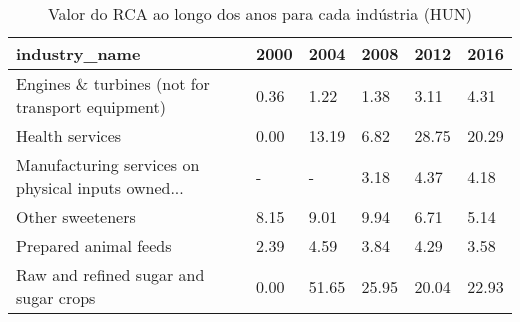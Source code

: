\begin{table}
\centering
\caption{Valor do RCA ao longo dos anos para cada indústria (HUN)}
\begin{tabular}{p{6cm}p{1.5cm}p{1.5cm}p{1.5cm}p{1.5cm}p{1.5cm}}
\toprule
                                     industry\_name & 2000 &  2004 &  2008 &  2012 &  2016 \\
\midrule
  Engines \& turbines (not for transport equipment) & 0.36 &  1.22 &  1.38 &  3.11 &  4.31 \\
                                   Health services & 0.00 & 13.19 &  6.82 & 28.75 & 20.29 \\
Manufacturing services on physical inputs owned... &    - &     - &  3.18 &  4.37 &  4.18 \\
                                  Other sweeteners & 8.15 &  9.01 &  9.94 &  6.71 &  5.14 \\
                             Prepared animal feeds & 2.39 &  4.59 &  3.84 &  4.29 &  3.58 \\
             Raw and refined sugar and sugar crops & 0.00 & 51.65 & 25.95 & 20.04 & 22.93 \\
\bottomrule
\end{tabular}
\end{table}
